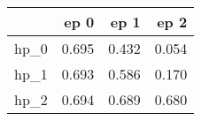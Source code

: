 \begin{tabular}{lrrr}
\toprule
{} &   ep 0 &   ep 1 &   ep 2 \\
\midrule
hp\_0 &  0.695 &  0.432 &  0.054 \\
hp\_1 &  0.693 &  0.586 &  0.170 \\
hp\_2 &  0.694 &  0.689 &  0.680 \\
\bottomrule
\end{tabular}
